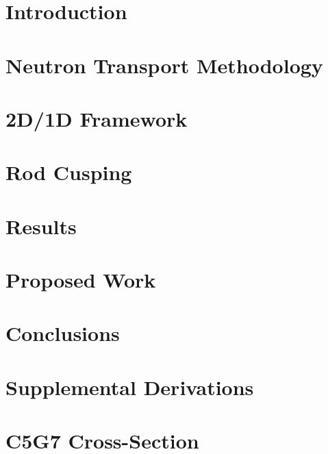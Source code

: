 \documentclass[12pt]{thesis-umich}
\begin{document}


\chapter{Introduction}\label{chap:intro}


\chapter{Neutron Transport Methodology}\label{chap:transport}


\chapter{2D/1D Framework}\label{chap:2d1d}


\chapter{Rod Cusping}\label{chap:cusping}


\chapter{Results}\label{chap:results}


\chapter{Proposed Work}\label{chap:proposed}

 
\chapter{Conclusions}\label{chap:concl}


\begin{appendices}

\chapter{Supplemental Derivations}\label{app:derivations}


\chapter{C5G7 Cross-Section}\label{app:c5g7xs}


\renewcommand{\bibname}{References}



\end{appendices}
\end{document}
